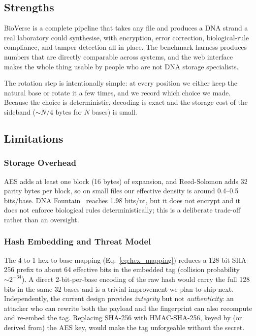 \documentclass[conference]{IEEEtran}
\begin{document}
\subsection{Strengths}

BioVerse is a complete pipeline that takes any file and produces a DNA strand a real laboratory could synthesise, with encryption, error correction, biological-rule compliance, and tamper detection all in place. The benchmark harness produces numbers that are directly comparable across systems, and the web interface makes the whole thing usable by people who are not DNA storage specialists.

The rotation step is intentionally simple: at every position we either keep the natural base or rotate it a few times, and we record which choice we made. Because the choice is deterministic, decoding is exact and the storage cost of the sideband ($\sim N/4$ bytes for $N$ bases) is small.

\subsection{Limitations}
\label{sec:limits}

\subsubsection{Storage Overhead}
AES adds at least one block (16 bytes) of expansion, and Reed-Solomon adds 32 parity bytes per block, so on small files our effective density is around 0.4--0.5 bits/base. DNA Fountain~\cite{b4} reaches 1.98 bits/nt, but it does not encrypt and it does not enforce biological rules deterministically; this is a deliberate trade-off rather than an oversight.

\subsubsection{Hash Embedding and Threat Model}
The 4-to-1 hex-to-base mapping (Eq.~\ref{eq:hex_mapping}) reduces a 128-bit SHA-256 prefix to about 64 effective bits in the embedded tag (collision probability $\sim 2^{-64}$). A direct 2-bit-per-base encoding of the raw hash would carry the full 128 bits in the same 32 bases and is a trivial improvement we plan to ship next. Independently, the current design provides \emph{integrity} but not \emph{authenticity}: an attacker who can rewrite both the payload and the fingerprint can also recompute and re-embed the tag. Replacing SHA-256 with HMAC-SHA-256, keyed by (or derived from) the AES key, would make the tag unforgeable without the secret.
\end{document}

